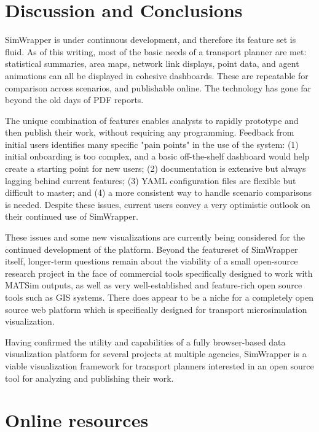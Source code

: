 \documentclass[3p,times,procedia]{elsarticle}
\begin{document}
\section{Discussion and Conclusions}

SimWrapper is under continuous development, and therefore its feature set is fluid. As of this writing, most of the basic needs of a transport planner are met: statistical summaries, area maps, network link displays, point data, and agent animations can all be displayed in cohesive dashboards. These are repeatable for comparison across scenarios, and publishable online. The technology has gone far beyond the old days of PDF reports.

The unique combination of features enables analysts to rapidly prototype and then publish their work, without requiring any programming. Feedback from initial users identifies many specific "pain points" in the use of the system: (1) initial onboarding is too complex, and a basic off-the-shelf dashboard would help create a starting point for new users; (2) documentation is extensive but always lagging behind current features; (3) YAML configuration files are flexible but difficult to master; and (4) a more consistent way to handle scenario comparisons is needed. Despite these issues, current users convey a very optimistic outlook on their continued use of SimWrapper.

These issues and some new visualizations are currently being considered for the continued development of the platform. Beyond the featureset of SimWrapper itself, longer-term questions remain about the viability of a small open-source research project in the face of commercial tools specifically designed to work with MATSim outputs, as well as very well-established and feature-rich open source tools such as GIS systems. There does appear to be a niche for a completely open source web platform which is specifically designed for transport microsimulation visualization.

Having confirmed the utility and capabilities of a fully browser-based data visualization platform for several projects at multiple agencies, SimWrapper is a viable visualization framework for transport planners interested in an open source tool for analyzing and publishing their work.

\section{Online resources}
\end{document}

